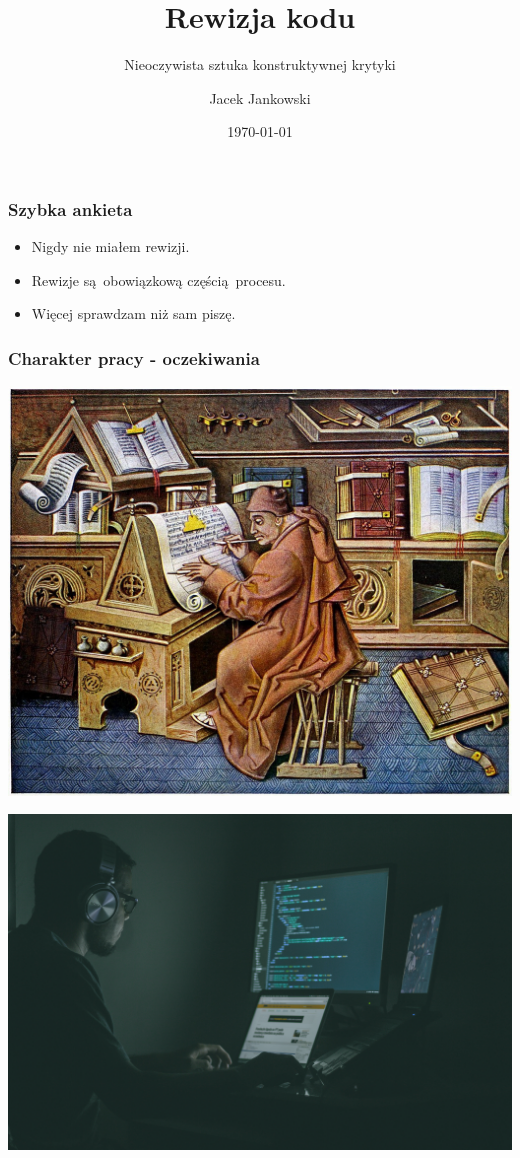 \documentclass[xcolor=dvipsnames]{beamer}%
\title{Rewizja kodu}
\subtitle{Nieoczywista sztuka konstruktywnej krytyki}
\author{Jacek Jankowski}
\date{\today}  %
\begin{document}
\begin{frame}
	\titlepage
\end{frame}

\begin{frame}
	\frametitle{Szybka ankieta}
	\begin{center}
		\begin{itemize}
			\item Nigdy nie miałem rewizji.
			\item Rewizje są obowiązkową częścią procesu.
			\item Więcej sprawdzam niż sam piszę.
		\end{itemize}
	\end{center}
\end{frame}

\begin{frame}
	\frametitle{Charakter pracy - oczekiwania}
	\begin{center}
		\begin{minipage}{0.45\textwidth}
			\includegraphics[width=\textwidth]{figure/skryba.jpg}
		\end{minipage}
		\begin{minipage}{0.45\textwidth}
			\includegraphics[width=\textwidth]{figure/programista.jpg}

\end{minipage}
\end{center}
\end{frame}
\end{document}

